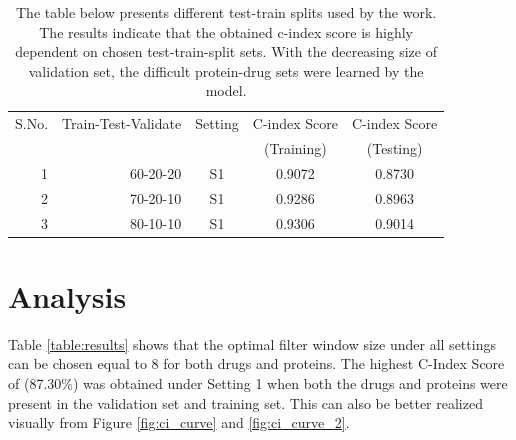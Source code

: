 \begin{table}
    \centering
    \caption[Validation Using Test-Train Splits]{The table below presents different test-train splits used by the work. The results indicate that the obtained c-index score is highly dependent on chosen test-train-split sets. With the decreasing size of validation set, the difficult protein-drug sets were learned by the model. }
    \begin{tabular}{|r|r|c|c|c|}
    \hline
    
    S.No. & Train-Test-Validate & Setting & C-index Score  & C-index Score  \\
        &                       &          & (Training) & (Testing)        \\
    \hline
    1 & 60-20-20 & S1 & 0.9072 & 0.8730 \\ \hline
    2 & 70-20-10 & S1 & 0.9286 & 0.8963 \\ \hline
    3 & 80-10-10 & S1 & 0.9306 & 0.9014 \\ \hline
    
    \end{tabular}
    \label{table:validation_hold_out}
    \end{table}


\section{Analysis}
Table \ref{table:results} shows that the optimal filter window size under all settings can be chosen equal to 8 for both drugs and proteins. The highest C-Index Score of (87.30\%) was obtained under Setting 1 when both the drugs and proteins were present in the validation set and training set. This can also be better realized visually from Figure \ref{fig:ci_curve} and \ref{fig:ci_curve_2}.
 
